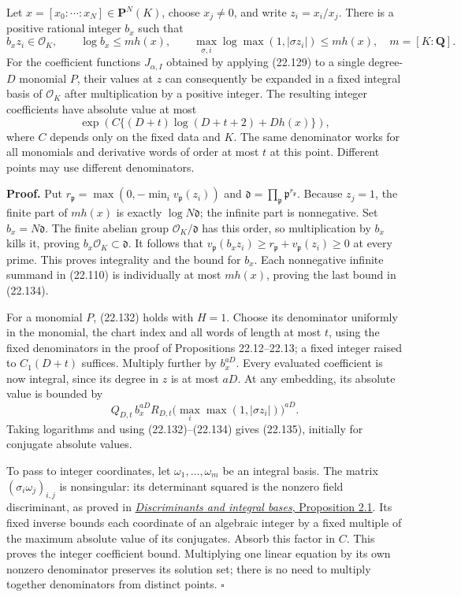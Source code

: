 \documentclass[
  11pt,
  a4paper,
]{article}
\begin{document}
Let \(x=[x_0:\cdots:x_N]\in\mathbf P^N(K)\), choose \(x_j\ne0\), and
write \(z_i=x_i/x_j\). There is a positive rational integer \(b_x\) such
that \[
 b_xz_i\in\mathcal O_K,\qquad
 \log b_x\le m h(x),\qquad
 \max_{\sigma,i}\log\max(1,|\sigma z_i|)\le m h(x),
 \quad m=[K:\mathbf Q].
 \tag{22.134}
\] For the coefficient functions \(J_{\alpha,I}\) obtained by applying
(22.129) to a single degree-\(D\) monomial \(P\), their values at \(z\)
can consequently be expanded in a fixed integral basis of
\(\mathcal O_K\) after multiplication by a positive integer. The
resulting integer coefficients have absolute value at most \[
 \exp\!\left(C\{(D+t)\log(D+t+2)+D h(x)\}\right),
 \tag{22.135}
\] where \(C\) depends only on the fixed data and \(K\). The same
denominator works for all monomials and derivative words of order at
most \(t\) at this point. Different points may use different
denominators.

\textbf{Proof.} Put
\(r_{\mathfrak p}=\max(0,-\min_i v_{\mathfrak p}(z_i))\) and
\(\mathfrak d=\prod_{\mathfrak p}\mathfrak p^{r_{\mathfrak p}}\).
Because \(z_j=1\), the finite part of \(m h(x)\) is exactly
\(\log N\mathfrak d\); the infinite part is nonnegative. Set
\(b_x=N\mathfrak d\). The finite abelian group
\(\mathcal O_K/\mathfrak d\) has this order, so multiplication by
\(b_x\) kills it, proving \(b_x\mathcal O_K\subset\mathfrak d\). It
follows that
\(v_{\mathfrak p}(b_xz_i)\ge r_{\mathfrak p}+v_{\mathfrak p}(z_i)\ge0\)
at every prime. This proves integrality and the bound for \(b_x\). Each
nonnegative infinite summand in (22.110) is individually at most
\(m h(x)\), proving the last bound in (22.134).

For a monomial \(P\), (22.132) holds with \(H=1\). Choose its
denominator uniformly in the monomial, the chart index and all words of
length at most \(t\), using the fixed denominators in the proof of
Propositions 22.12--22.13; a fixed integer raised to \(C_1(D+t)\)
suffices. Multiply further by \(b_x^{aD}\). Every evaluated coefficient
is now integral, since its degree in \(z\) is at most \(aD\). At any
embedding, its absolute value is bounded by \[
 Q_{D,t}\,b_x^{aD}R_{D,t}
       \bigl(\max_i\max(1,|\sigma z_i|)\bigr)^{aD}.
 \tag{22.136}
\] Taking logarithms and using (22.132)--(22.134) gives (22.135),
initially for conjugate absolute values.

To pass to integer coordinates, let \(\omega_1,\ldots,\omega_m\) be an
integral basis. The matrix \((\sigma_i\omega_j)_{i,j}\) is nonsingular:
its determinant squared is the nonzero field discriminant, as proved in
\href{https://kokunoyumeto.github.io/open-math-courses-public/courses/NT-ANT/discriminants-and-integral-bases.html\#a-determinant-that-measures-a-basis}{\emph{Discriminants
and integral bases}, Proposition 2.1}. Its fixed inverse bounds each
coordinate of an algebraic integer by a fixed multiple of the maximum
absolute value of its conjugates. Absorb this factor in \(C\). This
proves the integer coefficient bound. Multiplying one linear equation by
its own nonzero denominator preserves its solution set; there is no need
to multiply together denominators from distinct points. \(\square\)
\end{document}
